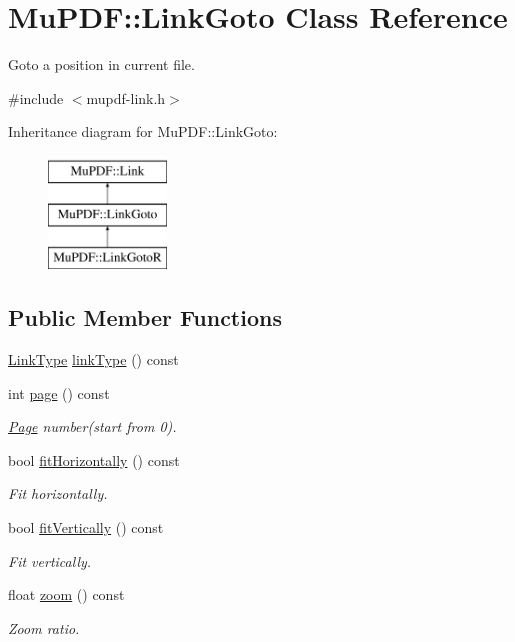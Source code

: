\hypertarget{class_mu_p_d_f_1_1_link_goto}{\section{Mu\-P\-D\-F\-:\-:Link\-Goto Class Reference}
\label{class_mu_p_d_f_1_1_link_goto}
}


Goto a position in current file.  




{\ttfamily \#include $<$mupdf-\/link.\-h$>$}

Inheritance diagram for Mu\-P\-D\-F\-:\-:Link\-Goto\-:\begin{figure}[H]
\begin{center}
\leavevmode
\includegraphics[height=3.000000cm]{class_mu_p_d_f_1_1_link_goto}
\end{center}
\end{figure}
\subsection*{Public Member Functions}
\begin{DoxyCompactItemize}
\item 
\hyperlink{class_mu_p_d_f_1_1_link_afdc6828b6e00f323b53d6ae36d0d06b6}{Link\-Type} \hyperlink{class_mu_p_d_f_1_1_link_goto_a057e2224fc0495b171d097f5886ae40a}{link\-Type} () const 
\item 
int \hyperlink{class_mu_p_d_f_1_1_link_goto_a83be7a158c0d4a3f8d61bfd0c3413d8c}{page} () const 
\begin{DoxyCompactList}\small\item\em \hyperlink{class_mu_p_d_f_1_1_page}{Page} number(start from 0). \end{DoxyCompactList}\item 
bool \hyperlink{class_mu_p_d_f_1_1_link_goto_a7074767dce7801874821840faa844917}{fit\-Horizontally} () const 
\begin{DoxyCompactList}\small\item\em Fit horizontally. \end{DoxyCompactList}\item 
bool \hyperlink{class_mu_p_d_f_1_1_link_goto_aea9a77cf7b01a2fc170afe35d7452c87}{fit\-Vertically} () const 
\begin{DoxyCompactList}\small\item\em Fit vertically. \end{DoxyCompactList}\item 
float \hyperlink{class_mu_p_d_f_1_1_link_goto_ab13b98ecc306c81149347eb05acbbcc1}{zoom} () const 
\begin{DoxyCompactList}\small\item\em Zoom ratio. \end{DoxyCompactList}\end{DoxyCompactItemize}
